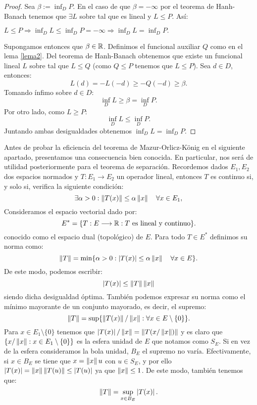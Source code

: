 	\begin{proof}
		Sea $ \beta := \inf_D P $. En el caso de que $ \beta = -\infty $ por el teorema de Hanh-Banach tenemos que $ \exists L $ sobre \vecSpace tal que es lineal y $ L \leq P$. Así:
		\begin{center}
			$ L \leq P \Longrightarrow \inf_D L \leq \inf_D P = -\infty \Longrightarrow \inf_D L = \inf_D P.$ 
		\end{center}
		Supongamos entonces que $ \beta \in \mathbb{R} $. Definimos el funcional auxiliar $ Q $ como en el lema \ref{lema2}. Del teorema de Hanh-Banach obtenemos que existe un funcional lineal $ L $ sobre \vecSpace tal que $ L \leq Q$ (como $ Q \leq P $ tenemos que $ L \leq P $). Sea $ d \in D $, entonces:
		\[
		L(d) = -L(-d) \geq -Q(-d) \geq \beta.
		\]
		Tomando ínfimo sobre $ d \in D $:
		\[
		\inf_D L \geq \beta = \inf_D P.
		\]
		Por otro lado, como $ L \geq P $:
		\[
		\inf_D L \leq\inf_D P.
		\]
		Juntando ambas desigualdades obtenemos $ \inf_D L =\inf_D P $.
	\end{proof}

\bigskip

\newcommand{\normSpace}{E}
Antes de probar la eficiencia del teorema de Mazur-Orlicz-König en el siguiente apartado, presentamos una consecuencia bien conocida. En particular, nos será de utilidad posteriormente para el teorema de separación. Recordemos dados $ \normSpace_1, \normSpace_2 $ dos espacios normados y $ T:\normSpace_1 \longrightarrow \normSpace_2 $ un operador lineal, entonces $ T $ es continuo si, y solo si, verifica la siguiente condición:
\[
\exists \alpha > 0 : \norm{T(x)} \leq \alpha \norm{x} \quad \forall x \in \normSpace_1,
\]
Consideramos el espacio vectorial dado por:
\[
\normSpace^* =  \lbrace T:\normSpace \longrightarrow \RR: T \text{ es lineal y continuo} \rbrace.
\]
conocido como el espacio dual (topológico) de $ E $. Para todo $ T \in \normSpace^* $ definimos su norma como:
\[
\norm{T} = \min \lbrace \alpha > 0:  \abs{T(x)} \leq \alpha \norm{x} \quad \forall x \in \normSpace\rbrace.
\]
De este modo, podemos escribir:
\begin{equation*}\label{desigNorma}
\left\vert T(x)\right\vert \leq \left\Vert T\right\Vert \left\Vert x\right\Vert
\end{equation*}
siendo dicha desigualdad óptima. También podemos expresar su norma como el mínimo mayorante de un conjunto mayorado, es decir, el supremo:
\[
\norm{T} = \sup \lbrace \norm{T(x)}/\norm{x} : \forall x \in \normSpace \setminus \{0\}\rbrace.
\]
Para $  x \in \normSpace_1 \setminus \{0\} $ tenemos que $ \left\vert T(x)\right\vert/\left\Vert x\right\Vert = \left\Vert T(x/\left\Vert x\right\Vert)\right\Vert$ y es claro que $ \{ x/\norm{x} : x \in \normSpace_1 \setminus \{0\}\} $ es la esfera unidad de $ \normSpace $ que notamos como $ S_\normSpace $. Si en vez de la esfera consideramos la bola unidad, $ B_\normSpace $ el supremo no varía. Efectivamente, si $ x \in B_\normSpace  $ se tiene que $ x = \left\Vert x\right\Vert u $ con $ u \in  S_\normSpace$, y por ello $ \left\vert T(x)\right\vert = \left\Vert x\right\Vert\left\Vert T(u)\right\Vert \leq \left\vert T(u)\right\vert $ ya que $ \left\Vert x\right\Vert \leq 1 $. De este modo, también tenemos que:
\begin{equation*}\label{normSup}
\norm{T} =\sup_{x \in B_\normSpace} \abs{T(x)}.
\end{equation*}

